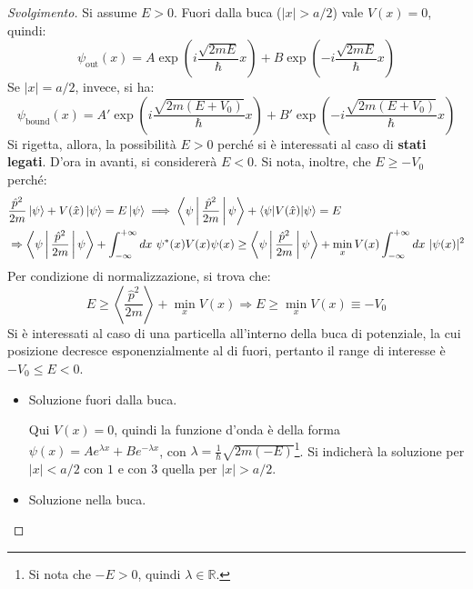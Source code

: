 \documentclass[10pt, a4paper]{scrartcl} %
\numberwithin{equation}{subsection}
\theoremstyle{style2}
\theoremstyle{style1}
\renewcommand\qedsymbol{$\blacksquare$}
\newenvironment{svolgimento}{\renewcommand\qedsymbol{$\spadesuit$}\begin{proof}[Svolgimento]}{\end{proof}}
\begin{document}
\begin{svolgimento}
	Si assume $E>0$. Fuori dalla buca ($\lvert x \rvert > a / 2$) vale $V(x) = 0$, quindi:
	\begin{equation}
		\psi _\text{out}(x) = A \exp \left(i \frac{\sqrt{2mE} }{\hbar }x\right) + B \exp \left( - i \frac{\sqrt{2mE} }{\hbar } x\right) 
	\end{equation}
	Se $\lvert x \rvert = a / 2$, invece, si ha:
	\begin{equation}
		\psi _\text{bound}(x) = A' \exp \left(i \frac{\sqrt{2m(E+V_0)} }{\hbar }x\right) + B' \exp \left( - i \frac{\sqrt{2m(E+V_0)} }{\hbar } x\right) 
	\end{equation}
	Si rigetta, allora, la possibilit\`a $E>0$ perch\'e si \`e interessati al caso di \textbf{stati legati}. D'ora in avanti, si considerer\`a $E<0$. Si nota, inoltre, che $E\ge -V_0$ perch\'e:
	\[
	\begin{split}
		&\frac{\hat{p}^2}{2m} \ket{\psi }  + V(\hat{x}) \ket{\psi } = E \ket{\psi } \implies \Braket{\psi |\frac{\hat{p}^2}{2m}|\psi } + \braket{\psi |V(\hat{x})|\psi } = E\\
		&\Rightarrow \Braket{\psi |\frac{\hat{p}^2}{2m}|\psi } + \int_{-\infty} ^{+\infty} dx\ \psi ^*(x) V(x) \psi (x) \ge \Braket{\psi |\frac{\hat{p}^2}{2m}|\psi } + \min_x V(x) \int_{-\infty} ^{+\infty} dx\ \lvert \psi (x) \rvert ^2
	\end{split}
	\] 
Per condizione di normalizzazione, si trova che: 
\begin{equation}
	E \ge \left\langle \frac{\hat{p}^2}{2m} \right\rangle + \min_x V(x) \Rightarrow  E\ge  \min_x V(x) \equiv -V_0
\end{equation}
Si \`e interessati al caso di una particella all'interno della buca di potenziale, la cui posizione decresce esponenzialmente al di fuori, pertanto il range di interesse \`e $-V_0\le E <0$. 

\begin{itemize}
	\item Soluzione fuori dalla buca.

		Qui $V(x) =0$, quindi la funzione d'onda \`e della forma $\psi (x) = Ae^{\lambda x} + B e^{-\lambda x} $, con $\lambda  = \frac{1}{\hbar } \sqrt{2m(-E)} $\footnote{Si nota che $-E > 0$, quindi $\lambda \in \mathbb{R}$.}. Si indicher\`a la soluzione per $\lvert x \rvert < a /2 $ con $1$ e con $3$ quella per $\lvert x \rvert > a / 2$.
	\item Soluzione nella buca.


\end{itemize}
\end{svolgimento}
\end{document}

